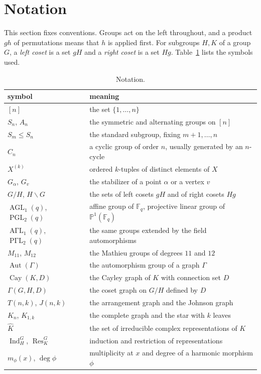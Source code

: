 \documentclass[12pt,letterpaper]{article}
\numberwithin{equation}{section}
\theoremstyle{definition}
\DeclareMathOperator{\agll}{AGL}
\DeclareMathOperator{\pgll}{PGL}
\DeclareMathOperator{\agaml}{A\Gamma L}
\DeclareMathOperator{\pgaml}{P\Gamma L}
\DeclareMathOperator{\autt}{Aut}
\DeclareMathOperator{\cayy}{Cay}
\DeclareMathOperator{\Ind}{Ind}
\DeclareMathOperator{\Res}{Res}
\begin{document}
\section{Notation}\label{sec:notation}
This section fixes conventions. Groups act on the left throughout, and a product $gh$ of permutations means that $h$ is applied first. For subgroups $H,K$ of a group $G$, a \emph{left coset} is a set $gH$ and a \emph{right coset} is a set $Hg$. Table~\ref{tab:notation} lists the symbols used.
\begin{table}[ht]
\centering\small
\begin{tabular}{@{}ll@{}}\toprule
symbol & meaning\\\midrule
$[n]$ & the set $\{1,\ldots,n\}$\\
$S_n$, $A_n$ & the symmetric and alternating groups on $[n]$\\
$S_m\leq S_n$ & the standard subgroup, fixing $m+1,\ldots,n$\\
$C_n$ & a cyclic group of order $n$, usually generated by an $n$-cycle\\
$X^{(k)}$ & ordered $k$-tuples of distinct elements of $X$\\
$G_\alpha$, $G_v$ & the stabilizer of a point $\alpha$ or a vertex $v$\\
$G/H$, $H\backslash G$ & the sets of left cosets $gH$ and of right cosets $Hg$\\
$\agll_1(q)$, $\pgll_2(q)$ & affine group of $\mathbb F_q$, projective linear group of $\mathbb P^1(\mathbb F_q)$\\
$\agaml_1(q)$, $\pgaml_2(q)$ & the same groups extended by the field automorphisms\\
$M_{11}$, $M_{12}$ & the Mathieu groups of degrees $11$ and $12$\\
$\autt(\Gamma)$ & the automorphism group of a graph $\Gamma$\\
$\cayy(K,D)$ & the Cayley graph of $K$ with connection set $D$\\
$\Gamma(G,H,D)$ & the coset graph on $G/H$ defined by $D$\\
$T(n,k)$, $J(n,k)$ & the arrangement graph and the Johnson graph\\
$K_n$, $K_{1,k}$ & the complete graph and the star with $k$ leaves\\
$\widehat K$ & the set of irreducible complex representations of $K$\\
$\Ind_H^G$, $\Res^G_K$ & induction and restriction of representations\\
$m_\phi(x)$, $\deg\phi$ & multiplicity at $x$ and degree of a harmonic morphism $\phi$\\
\bottomrule
\end{tabular}
\caption{Notation.}\label{tab:notation}
\end{table}
\end{document}
